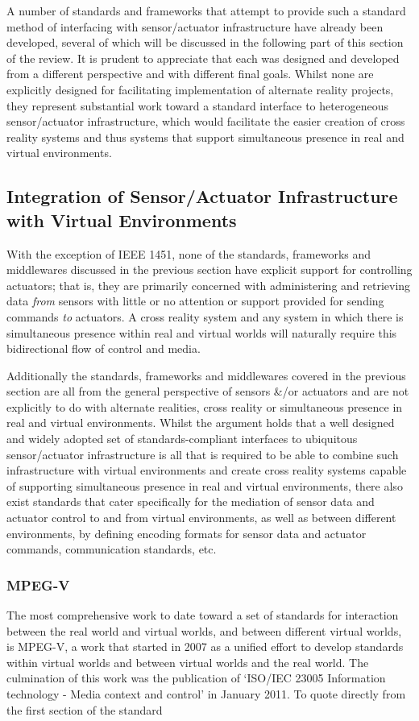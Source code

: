 A number of standards and frameworks that attempt to provide such a standard method of interfacing with sensor/actuator infrastructure have already been developed, several of which will be discussed in the following part of this section of the review. It is prudent to appreciate that each was designed and developed from a different perspective and with different final goals. Whilst none are explicitly designed for facilitating implementation of alternate reality projects, they represent substantial work toward a standard interface to heterogeneous sensor/actuator infrastructure, which would facilitate the easier creation of cross reality systems and thus systems that support simultaneous presence in real and virtual environments.

\subsection{Integration of Sensor/Actuator Infrastructure with Virtual Environments}
With the exception of IEEE 1451, none of the standards, frameworks and middlewares discussed in the previous section have explicit support for controlling actuators; that is, they are primarily concerned with administering and retrieving data \textit{from} sensors with little or no attention or support provided for sending commands \textit{to} actuators. A cross reality system and any system in which there is simultaneous presence within real and virtual worlds will naturally require this bidirectional flow of control and media.

Additionally the standards, frameworks and middlewares covered in the previous section are all from the general perspective of sensors \&/or actuators and are not explicitly to do with alternate realities, cross reality or simultaneous presence in real and virtual environments. Whilst the argument holds that a well designed and widely adopted set of standards-compliant interfaces to ubiquitous sensor/actuator infrastructure is all that is required to be able to combine such infrastructure with virtual environments and create cross reality systems capable of supporting simultaneous presence in real and virtual environments, there also exist standards that cater specifically for the mediation of sensor data and actuator control to and from virtual environments, as well as between different environments, by defining encoding formats for sensor data and actuator commands, communication standards, etc.

\subsubsection{MPEG-V}
The most comprehensive work to date toward a set of standards for interaction between the real world and virtual worlds, and between different virtual worlds, is MPEG-V, a work that started in 2007 as a unified effort to develop standards within virtual worlds and between virtual worlds and the real world. The culmination of this work was the publication of `ISO/IEC 23005 Information technology - Media context and control' in January 2011. To quote directly from the first section of the standard

